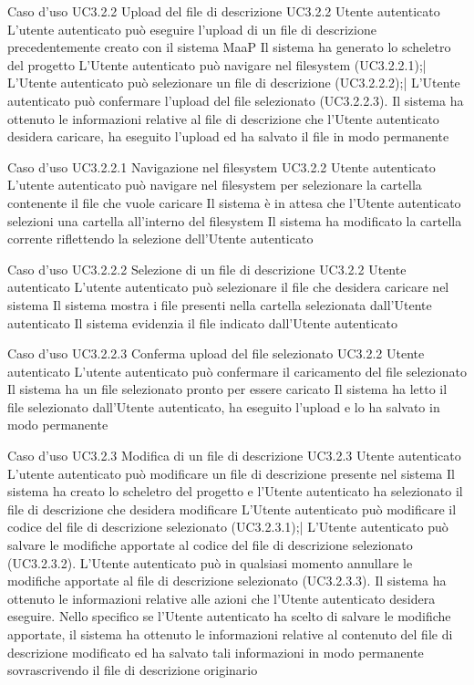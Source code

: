 \UCtitle
{Caso d'uso UC3.2.2}
{Upload del file di descrizione}
\UC
{UC3.2.2}
{Utente autenticato}
{L'utente autenticato può eseguire l'upload di un file di descrizione precedentemente creato con il sistema MaaP}
{Il sistema ha generato lo scheletro del progetto}
\scenario
{L'Utente autenticato può navigare nel filesystem (UC3.2.2.1);|
L'Utente autenticato può selezionare un file di descrizione (UC3.2.2.2);|
L'Utente autenticato può confermare l'upload del file selezionato (UC3.2.2.3).
}
\post
{Il sistema ha ottenuto le informazioni relative al file di descrizione che l'Utente autenticato desidera caricare, ha eseguito l'upload ed ha salvato il file in modo permanente}

\UCtitle
{Caso d'uso UC3.2.2.1}
{Navigazione nel filesystem}
\UC
{UC3.2.2}
{Utente autenticato}
{L'utente autenticato può navigare nel filesystem per selezionare la cartella contenente il file che vuole caricare}
{Il sistema è in attesa che l'Utente autenticato selezioni una cartella all'interno del filesystem}
\post
{Il sistema ha modificato la cartella corrente riflettendo la selezione dell'Utente autenticato}

\UCtitle
{Caso d'uso UC3.2.2.2}
{Selezione di un file di descrizione}
\UC
{UC3.2.2}
{Utente autenticato}
{L'utente autenticato può selezionare il file che desidera caricare nel sistema}
{Il sistema mostra i file presenti nella cartella selezionata dall'Utente autenticato}
\post
{Il sistema evidenzia il file indicato dall'Utente autenticato}

\UCtitle
{Caso d'uso UC3.2.2.3}
{Conferma upload del file selezionato}
\UC
{UC3.2.2}
{Utente autenticato}
{L'utente autenticato può confermare il caricamento del file selezionato}
{Il sistema ha un file selezionato pronto per essere caricato}
\post
{Il sistema ha letto il file selezionato dall'Utente autenticato, ha eseguito l'upload e lo ha salvato in modo permanente}

\UCtitle
{Caso d'uso UC3.2.3}
{Modifica di un file di descrizione}
\UC
{UC3.2.3}
{Utente autenticato}
{L'utente autenticato può modificare un file di descrizione presente nel sistema}
{Il sistema ha creato lo scheletro del progetto e l'Utente autenticato ha selezionato il file di descrizione che desidera modificare}
\scenario
{L'Utente autenticato può modificare il codice del file di descrizione selezionato (UC3.2.3.1);|
L'Utente autenticato può salvare le modifiche apportate al codice del file di descrizione selezionato (UC3.2.3.2).
}
\estensioni
{L'Utente autenticato può in qualsiasi momento annullare le modifiche apportate al file di descrizione selezionato (UC3.2.3.3).}
\post
{Il sistema ha ottenuto le informazioni relative alle azioni che l'Utente autenticato desidera eseguire. Nello specifico se l'Utente autenticato ha scelto di salvare le modifiche apportate, il sistema ha ottenuto le informazioni relative al contenuto del file di descrizione modificato ed ha salvato tali informazioni in modo permanente sovrascrivendo il file di descrizione originario}

